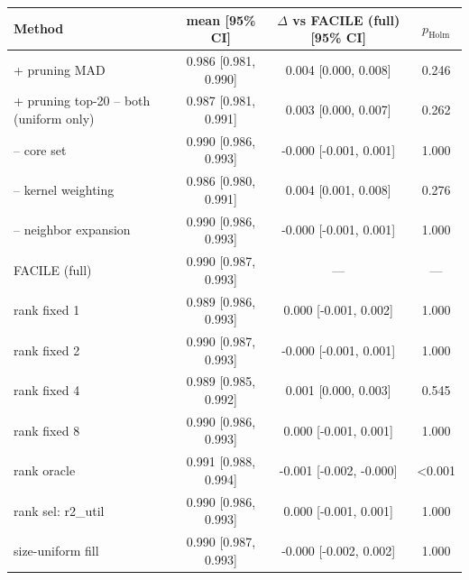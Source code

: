 \begin{tabular}{lccc}
\toprule
Method & mean [95\% CI] & $\Delta$ vs FACILE (full) [95\% CI] & $p_{\mathrm{Holm}}$ \\
\midrule
+ pruning MAD & 0.986 [0.981, 0.990] & 0.004 [0.000, 0.008] & 0.246 \\
+ pruning top-20%
-- both (uniform only) & 0.987 [0.981, 0.991] & 0.003 [0.000, 0.007] & 0.262 \\
-- core set & 0.990 [0.986, 0.993] & -0.000 [-0.001, 0.001] & 1.000 \\
-- kernel weighting & 0.986 [0.980, 0.991] & 0.004 [0.001, 0.008] & 0.276 \\
-- neighbor expansion & 0.990 [0.986, 0.993] & -0.000 [-0.001, 0.001] & 1.000 \\
FACILE (full) & 0.990 [0.987, 0.993] & --- & --- \\
rank fixed 1 & 0.989 [0.986, 0.993] & 0.000 [-0.001, 0.002] & 1.000 \\
rank fixed 2 & 0.990 [0.987, 0.993] & -0.000 [-0.001, 0.001] & 1.000 \\
rank fixed 4 & 0.989 [0.985, 0.992] & 0.001 [0.000, 0.003] & 0.545 \\
rank fixed 8 & 0.990 [0.986, 0.993] & 0.000 [-0.001, 0.001] & 1.000 \\
rank oracle & 0.991 [0.988, 0.994] & -0.001 [-0.002, -0.000] & <0.001 \\
rank sel: r2_util & 0.990 [0.986, 0.993] & 0.000 [-0.001, 0.001] & 1.000 \\
size-uniform fill & 0.990 [0.987, 0.993] & -0.000 [-0.002, 0.002] & 1.000 \\
\bottomrule
\end{tabular}

